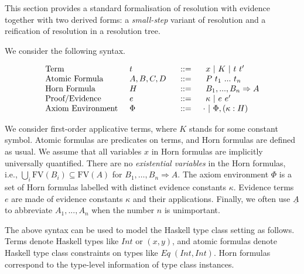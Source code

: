 \documentclass{llncs}
\newcommand{\Conid}[1]{\mathit{#1}}
\newcommand{\Varid}[1]{\mathit{#1}}
\begin{document}
This section provides a standard formalisation of resolution with evidence
together with two derived forms: a
\emph{small-step} variant of resolution and a reification of resolution in a
resolution tree.

We consider the following syntax.
\begin{definition}
{\small
\[\begin{array}{l@{\hspace{5mm}}l@{\hspace{5mm}}c@{\hspace{5mm}}l}
  \text{Term} & t \ & ::= & \ x \ | \ K\ | \ t\ t' \\
  \text{Atomic Formula} & A, B, C, D\ & ::= & \ P\ t_1 \ ...\ t_n \\
  \text{Horn Formula} & H \ & ::= & \ B_1,..., B_n \Rightarrow A \\
  \text{Proof/Evidence} & e \ & ::= & \ \kappa \ |\ e \ e' \\
  \text{Axiom Environment} & \Phi \ & ::= & \cdot \ | \ \Phi, (\kappa : H) 
\end{array} \]}
\end{definition}

We consider first-order applicative terms, where $K$ stands for some 
constant symbol. Atomic formulas are predicates
on terms, and Horn formulas are defined as usual. We assume that 
all variables $x$ in Horn formulas are implicitly universally quantified.
There are no \textit{existential variables} in the Horn formulas, i.e.,
$\bigcup_i \mathrm{FV}(B_i) \subseteq \mathrm{FV}(A)$ for $B_1,\ldots,B_n
\Rightarrow A$. 
The axiom environment $\Phi$ is a set of Horn formulas labelled with distinct
evidence constants $\kappa$. Evidence terms $e$ are made of evidence
constants $\kappa$ and their applications. Finally, 
we often use $\underline{A}$ to abbreviate $A_1,..., A_n$ when the number $n$ is
unimportant. 







The above syntax can be used to model the Haskell type class setting as follows.
Terms denote Haskell types like \ensuremath{\Conid{Int}} or \ensuremath{(\Varid{x},\Varid{y})}, and atomic formulas
denote Haskell type class constraints on types like \ensuremath{\Conid{Eq}\;(\Conid{Int},\Conid{Int})}. Horn formulas
correspond to the type-level information of type class instances. 
\end{document}
